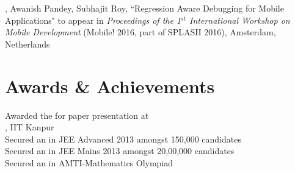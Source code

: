 \documentclass[mm]{simple_style}
\begin{document}
\begin{resume}
, Awanish Pandey, Subhajit Roy, ``Regression Aware Debugging for Mobile Applications" to appear in \textit{Proceedings of the 1$^{st}$ International Workshop on Mobile Development} (Mobile! 2016, part of SPLASH 2016), Amsterdam, Netherlands

\sectionline
\section{Awards \& Achievements}
Awarded the  for paper presentation at \\
, IIT Kanpur\\
Secured an  in JEE Advanced 2013 amongst 150,000 candidates\\
Secured an  in JEE Mains 2013 amongst 20,00,000 candidates\\
Secured an  in AMTI-Mathematics Olympiad

\sectionline


\end{resume}
\end{document}
